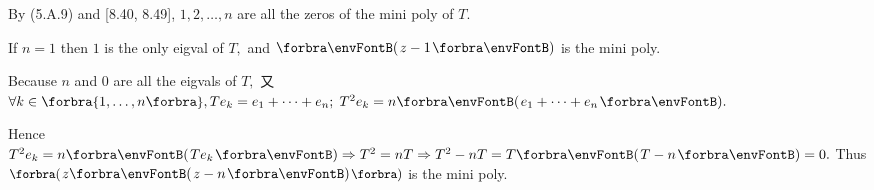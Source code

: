 \documentclass[a4paper, 11pt, UTF8]{article}
\begin{document}
\begin{large}
By (5.A.9) and [8.40, 8.49], $1,2,\dots,n$ are all the zeros of the mini poly of $T.$\PfEnd
\SepLine

\par\quad
If $n=1$ then $1$ is the only eigval of $T,$ and $\Par{z-1}$ is the mini poly.\par\quad
Because $n$ and $0$ are all the eigvals of $T,$ 又 $\forall k\in\Bra{1,\dots,n},T e_k=e_1+\dots+e_n;\;T^2 e_k=n \Par{e_1+\dots+e_n}.$\par\quad
Hence $T^2 e_k=n\Par{T e_k}\Rightarrow T^2=n T\Rightarrow T^2-n T=T\Par{T-n}=0.$ Thus $\BigPar{z\Par{z-n}}$ is the mini poly.\PfEnd
\SepLine


\end{large}
\end{document}
